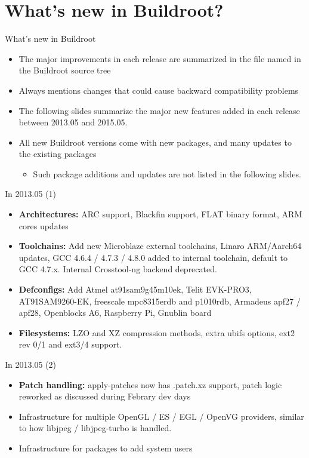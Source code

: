 \section{What's new in Buildroot?}

\begin{frame}{What's new in Buildroot}
  \begin{itemize}
  \item The major improvements in each release are summarized in the
    file named  in the Buildroot source tree
  \item Always mentions changes that could cause backward
    compatibility problems
  \item The following slides summarize the major new features added in
    each release between 2013.05 and 2015.05.
  \item All new Buildroot versions come with new packages, and many
    updates to the existing packages
    \begin{itemize}
    \item Such package additions and updates are not listed in the
      following slides.
    \end{itemize}
  \end{itemize}
\end{frame}

\begin{frame}{In 2013.05 (1)}
  \begin{itemize}
  \item {\bf Architectures:} ARC support, Blackfin support, FLAT
    binary format, ARM cores updates
  \item {\bf Toolchains:} Add new Microblaze external toolchains,
    Linaro ARM/Aarch64 updates, GCC 4.6.4 / 4.7.3 / 4.8.0 added to
    internal toolchain, default to GCC 4.7.x. Internal Crosstool-ng
    backend deprecated.
  \item {\bf Defconfigs:} Add Atmel at91sam9g45m10ek, Telit EVK-PRO3,
    AT91SAM9260-EK, freescale mpc8315erdb and p1010rdb, Armadeus apf27
    / apf28, Openblocks A6, Raspberry Pi, Gnublin board
  \item {\bf Filesystems:} LZO and XZ compression methods, extra ubifs
    options, ext2 rev 0/1 and ext3/4 support.
  \end{itemize}
\end{frame}

\begin{frame}{In 2013.05 (2)}
  \begin{itemize}
  \item {\bf Patch handling:} apply-patches now has .patch.xz support,
    patch logic reworked as discussed during Febrary dev days
  \item Infrastructure for multiple OpenGL / ES / EGL / OpenVG
    providers, similar to how libjpeg / libjpeg-turbo is handled.
  \item Infrastructure for packages to add system users
  \end{itemize}
\end{frame}

